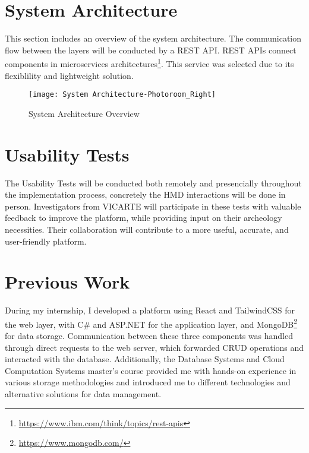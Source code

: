 \section{System Architecture}
\label{sec:architecture}

This section includes an overview of the system architecture. The communication flow between the layers will be conducted by a REST \gls{API}.
REST \glspl{API} connect components in microservices architectures\footnote{\url{https://www.ibm.com/think/topics/rest-apis}}.
This service was selected due to its flexiblility and lightweight solution. 

\begin{figure}[h!]
    \centering
    \texttt{[image: System Architecture-Photoroom\_Right]}
    \caption{System Architecture Overview}
    \label{fig:architecture}
  \end{figure}
  \FloatBarrier


\section{Usability Tests}
\label{sec:usability_tests}

The Usability Tests will be conducted both remotely and presencially throughout the implementation process, concretely the \gls{HMD} interactions will be done in person.
Investigators from \gls{VICARTE} will participate in these tests with valuable feedback to improve the platform, while providing input on their archeology necessities. Their collaboration will contribute to a more useful, accurate, and user-friendly platform.

\section{Previous Work}
\label{sec:previous_work}

During my internship, I developed a platform using React and TailwindCSS for the web layer, with C\# and ASP.NET for the application layer, and MongoDB\footnote{\url{https://www.mongodb.com/}} for data storage. Communication between these three components was handled through direct requests to the web server, which forwarded \gls{CRUD} operations and interacted with the database.  
Additionally, the Database Systems and Cloud Computation Systems master's course provided me with hands-on experience in various storage methodologies and introduced me to different technologies and alternative solutions for data management.

